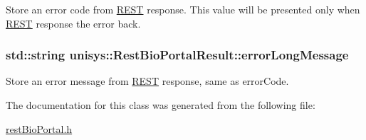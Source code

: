 Store an error code from \hyperlink{classunisys_1_1REST}{R\-E\-S\-T} response. This value will be presented only when \hyperlink{classunisys_1_1REST}{R\-E\-S\-T} response the error back. 

\hypertarget{classunisys_1_1RestBioPortalResult_acf0c58c40a61e51d925a12cd1d363706}{
\subsubsection[{error\-Long\-Message}]{\setlength{\rightskip}{0pt plus 5cm}std\-::string unisys\-::\-Rest\-Bio\-Portal\-Result\-::error\-Long\-Message\hspace{0.3cm}{\ttfamily [protected]}}}\label{classunisys_1_1RestBioPortalResult_acf0c58c40a61e51d925a12cd1d363706}


Store an error message from \hyperlink{classunisys_1_1REST}{R\-E\-S\-T} response, same as error\-Code. 



The documentation for this class was generated from the following file\-:\begin{DoxyCompactItemize}
\item 
\hyperlink{restBioPortal_8h}{rest\-Bio\-Portal.\-h}\end{DoxyCompactItemize}
